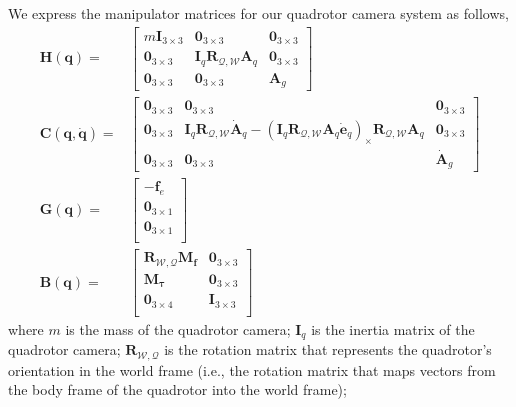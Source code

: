 We express the manipulator matrices for our quadrotor camera system as follows,
%
\begin{equation}
\begin{aligned}
\mathbf{H}(\mathbf{q}) = &
\begin{bmatrix}
m\mathbf{I}_{3\times3} & \mathbf{0}_{3\times3} & \mathbf{0}_{3\times3} \\
\mathbf{0}_{3\times3}                          & \mathbf{I}_{q} \mathbf{R}_{\mathcal{Q},\mathcal{W}} \mathbf{A}_q & \mathbf{0}_{3\times3} \\
\mathbf{0}_{3\times3}                          & \mathbf{0}_{3\times3} & \mathbf{A}_{g}
\end{bmatrix} \\
%
\mathbf{C}(\mathbf{q},\dot{\mathbf{q}}) = &
\begin{bmatrix}
\mathbf{0}_{3\times3} & \mathbf{0}_{3\times3}  & \mathbf{0}_{3\times3} \\
\mathbf{0}_{3\times3} & \mathbf{I}_q \mathbf{R}_{\mathcal{Q},\mathcal{W}} \dot{\mathbf{A}}_q - \left(\mathbf{I}_q \mathbf{R}_{\mathcal{Q},\mathcal{W}} \mathbf{A}_q \dot{\mathbf{e}}_q \right)_{\times}\mathbf{R}_{\mathcal{Q},\mathcal{W}} \mathbf{A}_q & \mathbf{0}_{3\times3} \\
\mathbf{0}_{3\times3} & \mathbf{0}_{3\times3}  & \dot{\mathbf{A}}_g
\end{bmatrix} \\
%
\mathbf{G}(\mathbf{q}) = &
\begin{bmatrix}
-\mathbf{f}_e \\
\mathbf{0}_{3\times1} \\
\mathbf{0}_{3\times1} \\
\end{bmatrix} \\
%
\mathbf{B}(\mathbf{q}) = &
\begin{bmatrix}
\mathbf{R}_{\mathcal{W},\mathcal{Q}} \mathbf{M}_{\mathbf{f}}    & \mathbf{0}_{3\times3} \\
\mathbf{M}_{\mathbf{\tau}}                                      & \mathbf{0}_{3\times3} \\
\mathbf{0}_{3\times4}                                           & \mathbf{I}_{3\times3} \\
\end{bmatrix}
\end{aligned}
\end{equation}
%
where $m$ is the mass of the quadrotor camera;
$\mathbf{I}_q$ is the inertia matrix of the quadrotor camera;
$\mathbf{R}_{\mathcal{W},\mathcal{Q}}$ is the rotation matrix that represents the quadrotor's orientation in the world frame (i.e., the rotation matrix that maps vectors from the body frame of the quadrotor into the world frame);
